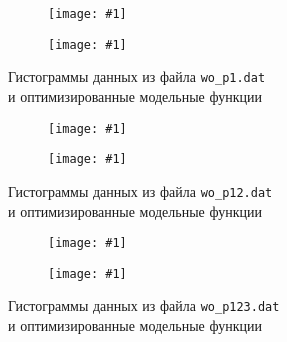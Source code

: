 \documentclass[a4paper, oneside]{article}
\newlength{\imagewidth}
\newlength{\imageheight}
\newcommand{\subgraphics}[1]{
\settowidth{\imagewidth}{\texttt{[image: \#1]}}%
\begin{subfigure}{\imagewidth}%
    \texttt{[image: \#1]}%
\end{subfigure}%
}
\begin{document}
\begin{figure}[H]
  \centering
  \setlength{\imageheight}{6.2cm}
  \subgraphics{wo_p1/histogram, 0.1}
  \subgraphics{wo_p1/histogram, 0.2}
  \caption{Гистограммы данных из файла \texttt{wo\_p1.dat} \\ и оптимизированные модельные функции}
\end{figure}

\newpage

\begin{figure}[H]
  \centering
  \setlength{\imageheight}{6.2cm}
  \subgraphics{wo_p12/histogram, 0.1}
  \subgraphics{wo_p12/histogram, 0.2}
  \caption{Гистограммы данных из файла \texttt{wo\_p12.dat} \\ и оптимизированные модельные функции}
\end{figure}

\begin{figure}[H]
  \centering
  \setlength{\imageheight}{6.2cm}
  \subgraphics{wo_p123/histogram, 0.1}
  \subgraphics{wo_p123/histogram, 0.2}
  \caption{Гистограммы данных из файла \texttt{wo\_p123.dat} \\ и оптимизированные модельные функции}
\end{figure}
\end{document}
